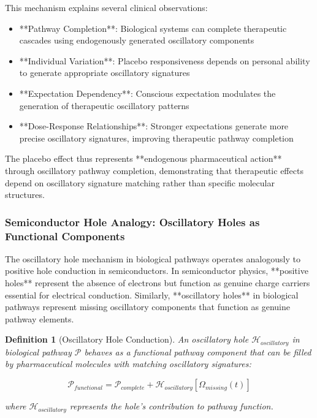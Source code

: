 \documentclass[12pt,a4paper]{article}
\newtheorem{definition}{Definition}[section]
\begin{document}
This mechanism explains several clinical observations:

\begin{itemize}
\item **Pathway Completion**: Biological systems can complete therapeutic cascades using endogenously generated oscillatory components
\item **Individual Variation**: Placebo responsiveness depends on personal ability to generate appropriate oscillatory signatures
\item **Expectation Dependency**: Conscious expectation modulates the generation of therapeutic oscillatory patterns
\item **Dose-Response Relationships**: Stronger expectations generate more precise oscillatory signatures, improving therapeutic pathway completion
\end{itemize}

The placebo effect thus represents **endogenous pharmaceutical action** through oscillatory pathway completion, demonstrating that therapeutic effects depend on oscillatory signature matching rather than specific molecular structures.

\subsubsection{Semiconductor Hole Analogy: Oscillatory Holes as Functional Components}

The oscillatory hole mechanism in biological pathways operates analogously to positive hole conduction in semiconductors. In semiconductor physics, **positive holes** represent the absence of electrons but function as genuine charge carriers essential for electrical conduction. Similarly, **oscillatory holes** in biological pathways represent missing oscillatory components that function as genuine pathway elements.

\begin{definition}[Oscillatory Hole Conduction]
An oscillatory hole $\mathcal{H}_{oscillatory}$ in biological pathway $\mathcal{P}$ behaves as a functional pathway component that can be filled by pharmaceutical molecules with matching oscillatory signatures:

\begin{equation}
\mathcal{P}_{functional} = \mathcal{P}_{complete} + \mathcal{H}_{oscillatory}[\Omega_{missing}(t)]
\end{equation}

where $\mathcal{H}_{oscillatory}$ represents the hole's contribution to pathway function.
\end{definition}
\end{document}
